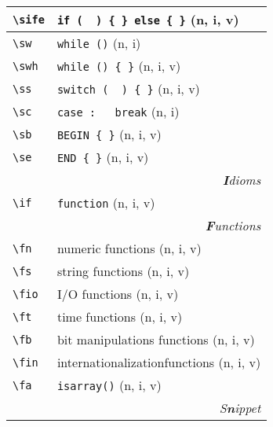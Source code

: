 \documentclass[oneside,10pt,landscape,DIV16]{scrartcl}
\begin{document}
\begin{multicols}{3}
\begin{center}
\begin{tabular}[]{|p{11mm}|p{60mm}|}
\hline \verb'\sife'    & \verb'if (  ) { } else { }'  \hfill (n, i, v)\\
\hline \verb'\sw'      & \verb'while ()'              \hfill (n, i)\\
\hline \verb'\swh'     & \verb'while () { }'          \hfill (n, i, v)\\
\hline \verb'\ss'      & \verb'switch (  ) { }'       \hfill (n, i, v)\\
\hline \verb'\sc'      & \verb'case :	break'          \hfill (n, i)\\
\hline \verb'\sb'      & \verb'BEGIN { }'             \hfill (n, i, v)\\
\hline \verb'\se'      & \verb'END { }'               \hfill (n, i, v)\\
\hline
\hline
\multicolumn{2}{|r|}{\textsl{\textbf{I}dioms}}                 \\[1.0ex]
\hline \verb'\if' & \verb'function'            \hfill (n, i, v)\\
\hline
\hline
\hline
\multicolumn{2}{|r|}{\textsl{\textbf{F}unctions}}              \\[1.0ex]
\hline \verb'\fn ' & numeric functions                       \hfill (n, i, v)\\
\hline \verb'\fs ' & string functions                        \hfill (n, i, v)\\
\hline \verb'\fio' & I/O functions                           \hfill (n, i, v)\\
\hline \verb'\ft ' & time functions                          \hfill (n, i, v)\\
\hline \verb'\fb ' & bit manipulations functions             \hfill (n, i, v)\\
\hline \verb'\fin' & internationalizationfunctions           \hfill (n, i, v)\\
\hline \verb'\fa ' & \texttt{isarray()}                      \hfill (n, i, v)\\
\hline
\hline
\multicolumn{2}{|r|}{\textsl{S\textbf{n}ippet}}                \\[1.0ex]

\end{tabular}
\end{center}
\end{multicols}
\end{document}
